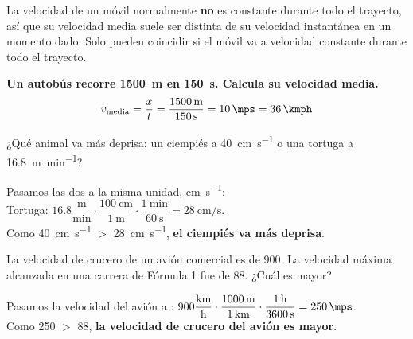 \begin{impt}
    La velocidad de un móvil normalmente \textbf{no} es constante durante todo el trayecto, así que su velocidad media suele ser distinta de su velocidad instantánea en un momento dado. Solo pueden coincidir si el móvil va a velocidad constante durante todo el trayecto.
\end{impt}

\begin{example}
    \textbf{Un autobús recorre \qty{1500}{\m} en \qty{150}{\s}. Calcula su velocidad media.}
    \begin{equation*}
        v_{\text{media}} = \dfrac{x}{t} = \dfrac{\qty{1500}{\m}}{\qty{150}{\s}} = \qty{10}{\mps} = \qty{36}{\kmph}
    \end{equation*}
\end{example}

\begin{exercise}
    ¿Qué animal va más deprisa: un ciempiés a \qty{40}{\cm\per\s} o una tortuga a \qty{16.8}{\m\per\minute}?
    \begin{solu}
        Pasamos las dos a la misma unidad, \unit{\cm\per\s}: \\
        Tortuga: \(16.8 \dfrac{\text{m}}{\text{min}} \cdot \dfrac{\qty{100}{\cm}}{\qty{1}{\m}} \cdot \dfrac{\qty{1}{\minute}}{\qty{60}{\s}} = \qty{28}{\cm\per\s}\). \\
        Como \qty{40}{\cm\per\s} \(>\) \qty{28}{\cm\per\s}, \textbf{el ciempiés va más deprisa}.
    \end{solu}
\end{exercise}

\begin{exercise}
    La velocidad de crucero de un avión comercial es de \qty{900}{\kmph}. La velocidad máxima alcanzada en una carrera de Fórmula 1 fue de \qty{88}{\mps}. ¿Cuál es mayor?
    \begin{solu}
        Pasamos la velocidad del avión a \unit{\mps}: \(900 \dfrac{\text{km}}{\text{h}} \cdot \dfrac{\qty{1000}{\m}}{\qty{1}{\km}} \cdot \dfrac{\qty{1}{\hour}}{\qty{3600}{\s}} = \qty{250}{\mps}\). \\
        Como \qty{250}{\mps} \(>\) \qty{88}{\mps}, \textbf{la velocidad de crucero del avión es mayor}.
    \end{solu}
\end{exercise}

